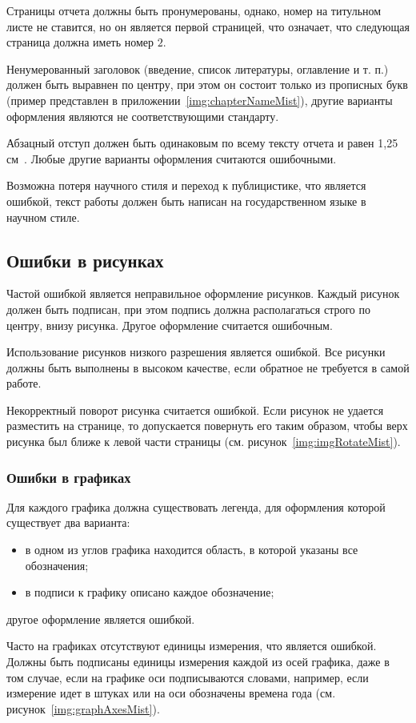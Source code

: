 Страницы отчета должны быть пронумерованы, однако, номер на титульном листе не ставится, но он является первой страницей, что означает, что следующая страница должна иметь номер ${2}$.

Ненумерованный заголовок (введение, список литературы, оглавление и т. п.) должен быть выравнен по центру, при этом он состоит только из прописных букв (пример представлен в приложении~\ref{img:chapterNameMist}), другие варианты оформления являются не соответствующими стандарту.

Абзацный отступ должен быть одинаковым по всему тексту отчета и равен 1,25 см~\cite{GOST732}. Любые другие варианты оформления считаются ошибочными.

Возможна потеря научного стиля и переход к публицистике, что является ошибкой, текст работы должен быть написан на государственном языке в научном стиле.

\subsection{Ошибки в рисунках}
Частой ошибкой является неправильное оформление рисунков. Каждый рисунок должен быть подписан, при этом подпись должна располагаться строго по центру, внизу рисунка. Другое оформление считается ошибочным.

Использование рисунков низкого разрешения является ошибкой. Все рисунки должны быть выполнены в высоком качестве, если обратное не требуется в самой работе.

Некорректный поворот рисунка считается ошибкой. Если рисунок не удается разместить на странице, то допускается повернуть его таким образом, чтобы верх рисунка был ближе к левой части страницы (см. рисунок~\ref{img:imgRotateMist}).

\subsubsection{Ошибки в графиках}
Для каждого графика должна существовать легенда, для оформления которой существует два варианта:
\begin{itemize}
	\item в одном из углов графика находится область, в которой указаны все обозначения;
	\item в подписи к графику описано каждое обозначение;
\end{itemize}
другое оформление является ошибкой.

Часто на графиках отсутствуют единицы измерения, что является ошибкой. Должны быть подписаны единицы измерения каждой из осей графика, даже в том случае, если на графике оси подписываются словами, например, если измерение идет в штуках или на оси обозначены времена года (см. рисунок~\ref{img:graphAxesMist}).

